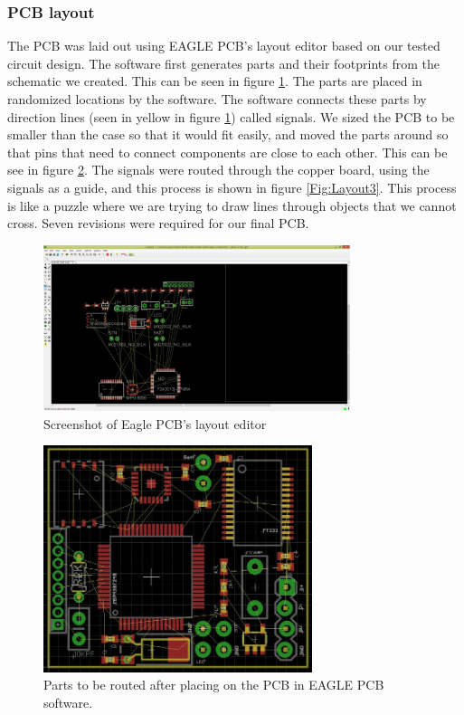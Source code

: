 \subsubsection{PCB layout}
The PCB was laid out using EAGLE PCB's layout editor based on our tested circuit design.
The software first generates parts and their footprints from the schematic we created.
This can be seen in figure \ref{Fig:Layout1}.
The parts are placed in randomized locations by the software.
The software connects these parts by direction lines (seen in yellow in figure \ref{Fig:Layout1}) called signals.
We sized the PCB to be smaller than the case so that it would fit easily, and moved the parts around so that pins that need to connect components are close to each other.
This can be see in figure \ref{Fig:Layout2}.
The signals were routed through the copper board,
using the signals as a guide, and this process is shown in figure \ref{Fig:Layout3}.
This process is like a puzzle where we are trying to draw lines through objects that we cannot cross.
Seven revisions were required for our final PCB.
\begin{figure}
\begin{center}
\includegraphics[width=0.8\textwidth]{images/Layout1.jpg}
\caption{Screenshot of Eagle PCB's layout editor}
\label{Fig:Layout1}
\end{center}
\end{figure}
\begin{figure}
\begin{center}
\includegraphics[width=0.7\textwidth]{images/Layout2.jpg}
\caption{Parts to be routed after placing on the PCB in EAGLE PCB software.}
\label{Fig:Layout2}
\end{center}
\end{figure}
